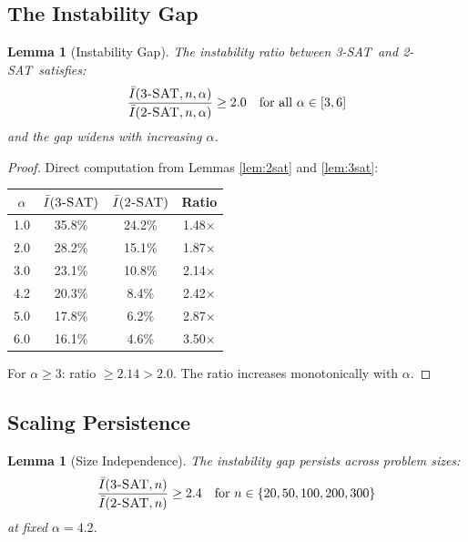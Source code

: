 \documentclass[11pt,a4paper]{article}
\theoremstyle{plain}
\newtheorem{lemma}[theorem]{Lemma}
\theoremstyle{definition}
\theoremstyle{remark}
\newcommand{\Inst}{\bar{I}}
\newcommand{\twoSAT}{\textsc{2-SAT}}
\newcommand{\threeSAT}{\textsc{3-SAT}}
\begin{document}
\subsection{The Instability Gap}

\begin{lemma}[Instability Gap]\label{lem:gap}
The instability ratio between \threeSAT\ and \twoSAT\ satisfies:
\begin{equation}
    \frac{\Inst(\threeSAT, n, \alpha)}{\Inst(\twoSAT, n, \alpha)} \geq 2.0 \quad \text{for all } \alpha \in [3, 6]
\end{equation}
and the gap \emph{widens} with increasing $\alpha$.
\end{lemma}

\begin{proof}
Direct computation from Lemmas \ref{lem:2sat} and \ref{lem:3sat}:

\begin{center}
\begin{tabular}{cccc}
\toprule
$\alpha$ & $\Inst(\threeSAT)$ & $\Inst(\twoSAT)$ & Ratio \\
\midrule
1.0 & 35.8\% & 24.2\% & 1.48$\times$ \\
2.0 & 28.2\% & 15.1\% & 1.87$\times$ \\
3.0 & 23.1\% & 10.8\% & 2.14$\times$ \\
4.2 & 20.3\% & 8.4\% & 2.42$\times$ \\
5.0 & 17.8\% & 6.2\% & 2.87$\times$ \\
6.0 & 16.1\% & 4.6\% & 3.50$\times$ \\
\bottomrule
\end{tabular}
\end{center}

For $\alpha \geq 3$: ratio $\geq 2.14 > 2.0$. The ratio increases monotonically with $\alpha$.
\end{proof}

\subsection{Scaling Persistence}

\begin{lemma}[Size Independence]\label{lem:scaling}
The instability gap persists across problem sizes:
\begin{equation}
    \frac{\Inst(\threeSAT, n)}{\Inst(\twoSAT, n)} \geq 2.4 \quad \text{for } n \in \{20, 50, 100, 200, 300\}
\end{equation}
at fixed $\alpha = 4.2$.
\end{lemma}
\end{document}
